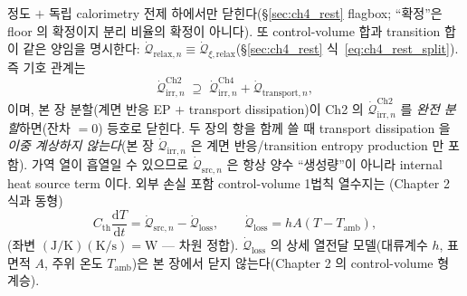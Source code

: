 \documentclass[11pt,a4paper]{article}
\newcommand{\dd}{\mathrm{d}}
\newcommand{\irr}{\mathrm{irr}}
\newcommand{\src}{\mathrm{src}}
\newcommand{\loss}{\mathrm{loss}}
\newcommand{\rlx}{\mathrm{relax}}
\newcommand{\transp}{\mathrm{transport}}
\newcommand{\amb}{\mathrm{amb}}
\begin{document}
정도 $+$ 독립 calorimetry 전제 하에서만 닫힌다(\S\ref{sec:ch4_rest} flagbox; ``확정''은 floor 의 확정이지
분리 비율의 확정이 아니다). 또 control-volume 합과 transition 합이 같은 양임을 명시한다:
$\dot{\mathcal Q}_{\rlx,n}\equiv\dot{\mathcal Q}_{\xi,\rlx}$(\S\ref{sec:ch4_rest} 식~\eqref{eq:ch4_rest_split}).
즉 기호 관계는
\begin{equation}
\dot{\mathcal Q}_{\irr,n}^{\mathrm{Ch2}}\;\supseteq\;\dot{\mathcal Q}_{\irr,n}^{\mathrm{Ch4}}+\dot{\mathcal Q}_{\transp,n},
\label{eq:ch4_ch2refine}
\end{equation}
이며, 본 장 분할(계면 반응 EP $+$ transport dissipation)이 Ch2 의 $\dot{\mathcal Q}_{\irr,n}^{\mathrm{Ch2}}$ 를
\emph{완전 분할}하면(잔차 $=0$) 등호로 닫힌다. 두 장의 항을 함께 쓸 때 transport dissipation 을 \emph{이중
계상하지 않는다}(본 장 $\dot{\mathcal Q}_{\irr,n}$
은 계면 반응/transition entropy production 만 포함). 가역 열이 흡열일 수 있으므로 $\dot{\mathcal Q}_{\src,n}$
은 항상 양수 ``생성량''이 아니라 internal heat source term 이다. 외부 손실 포함 control-volume 1법칙 열수지는
(Chapter 2 식과 동형)
\begin{equation}
C_{\mathrm{th}}\frac{\dd T}{\dd t}=\dot{\mathcal Q}_{\src,n}-\dot{\mathcal Q}_{\loss},\qquad
\dot{\mathcal Q}_{\loss}=hA(T-T_\amb),
\label{eq:ch4_balance}
\end{equation}
(좌변 $\mathrm{(J/K)(K/s)=W}$ — 차원 정합). $\dot{\mathcal Q}_{\loss}$ 의 상세 열전달 모델(대류계수 $h$, 표면적
$A$, 주위 온도 $T_\amb$)은 본 장에서 닫지 않는다(Chapter 2 의 control-volume 형 계승).

\end{document}
